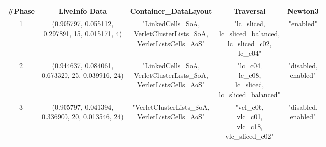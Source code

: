 \begin{table}[h]
    \footnotesize
    \centering
    \begin{tabular}{|c|c|c|c|c|}
        \hline
        \textbf{\#Phase}       &
        \textbf{LiveInfo Data} & \textbf{Container\_DataLayout} & \textbf{Traversal} & \textbf{Newton3}          \\
        \hline
        1                      & \makecell{(0.905797,	0.055112,                                                   \\	0.297891,	15,	0.015171,	4) }                                                                                                              & \makecell{"LinkedCells\_SoA,                                                \\ VerletClusterLists\_SoA, \\ VerletListsCells\_AoS"} & \makecell{"lc\_sliced,\\ lc\_sliced\_balanced,\\ lc\_sliced\_c02,\\ lc\_c04"} & "enabled"          \\
        \hline
        2                      & \makecell{(0.944637,	0.084061,                                                   \\	0.673320,                                                                                                                                                                                                   	25,	0.039916, 24) }                                                                                                               & \makecell{"LinkedCells\_SoA,                                                \\ VerletClusterLists\_SoA, \\ VerletListsCells\_AoS"} & \makecell{"lc\_c04,\\ lc\_c08,\\ lc\_sliced,\\ lc\_sliced\_balanced"} &  \makecell{"disabled,\\enabled"}         \\
        \hline
        3                      & \makecell{(0.905797,	0.041394,                                                   \\	0.336900,                                                                                                                                                                                                   	20,	0.013546, 24) }                                                                                                               & \makecell{"VerletClusterLists\_SoA,                                         \\ VerletListsCells\_AoS"} & \makecell{"vcl\_c06,\\ vlc\_c01,\\ vlc\_c18,\\ vlc\_sliced\_c02"} &  \makecell{"disabled,\\enabled"}         \\
        \hline


\end{tabular}
\end{table}
